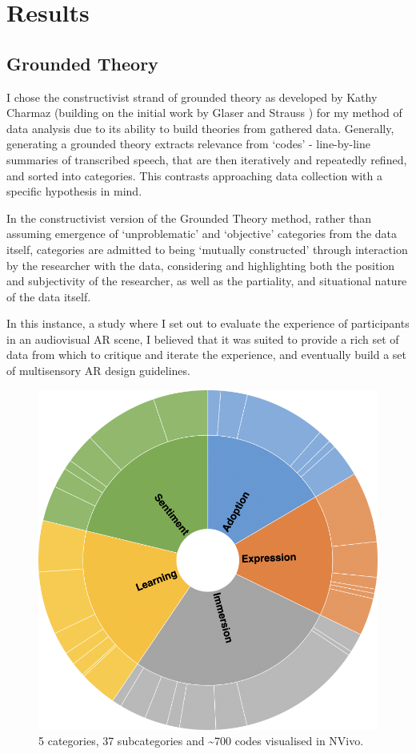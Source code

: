 \section{Results}\label{sec: polaris-feedback}
\subsection{Grounded Theory}\label{sec: polaris-feedback-grounded}
I chose the constructivist strand of grounded theory as developed by Kathy Charmaz \citeyearpar{charmaz2006} (building on the initial work by Glaser and Strauss \citeyearpar{glaser1967}) for my method of data analysis due to its ability to build theories from gathered data. Generally, generating a grounded theory extracts relevance from `codes' - line-by-line summaries of transcribed speech, that are then iteratively and repeatedly refined, and sorted into categories. This contrasts approaching data collection with a specific hypothesis in mind.

In the constructivist version of the Grounded Theory method, rather than assuming emergence of `unproblematic' and `objective' categories from the data itself, categories are admitted to being `mutually constructed' through interaction by the researcher with the data, considering and highlighting both the position and subjectivity of the researcher, as well as the partiality, and situational nature of the data itself.

In this instance, a study where I set out to evaluate the experience of participants in an audiovisual AR scene, I believed that it was suited to provide a rich set of data from which to critique and iterate the experience, and eventually build a set of multisensory AR design guidelines.

\begin{figure}
    \centering
    \includegraphics[width=0.7\linewidth]{figures/06-polaris/polaris-feedback-grounded-codes.png}
    \caption{5 categories, 37 subcategories and \textasciitilde{}700 codes visualised in NVivo.}
    \label{fig: polaris-feedback-grounded-codes}
\end{figure}

